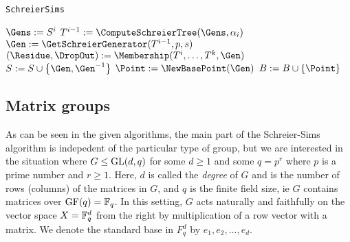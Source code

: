 \begin{algorithm} 
\dontprintsemicolon
\caption{\texttt{SchreierSims}}



\Begin
{
  $\Gens := S^i$ \;
  $T^{i - 1} := \ComputeSchreierTree(\Gens, \alpha_i)$ \;
  {
    {
      $\Gen := \GetSchreierGenerator(T^{i - 1}, p, s)$ \;
      {
        $(\Residue, \DropOut) := \Membership(T^i, \dotsc, T^k, \Gen)$ \;
        {
          $S := S \cup \set{\Gen, \Gen^{-1}}$ \;
          {
            $\Point := \NewBasePoint(\Gen)$ \;
            $B := B \cup \set{\Point}$ \;
          }
        }
      }    
    }
  }
}
\label{alg:ss}
\end{algorithm}

\subsection{Matrix groups}
As can be seen in the given algorithms, the main part of the
Schreier-Sims algorithm is indepedent of the particular type of group,
but we are interested in the situation where $G \leq \operatorname{GL}(d, q)$ for
some $d \geq 1$ and some $q = p^r$ where $p$ is a prime number and $r
\geq 1$. Here, $d$ is called the \emph{degree} of $G$ and is the
number of rows (columns) of the matrices in $G$, and $q$ is the finite
field size, ie $G$ contains matrices over $\operatorname{GF}(q) = \mathbb{F}_q$. In this
setting, $G$ acts naturally and faithfully on the vector space $X = \mathbb{F}_q^d$ from the
right by multiplication of a row vector with a matrix. We denote the standard base in $F_q^d$ by $e_1, e_2, \dotsc, e_d$.

